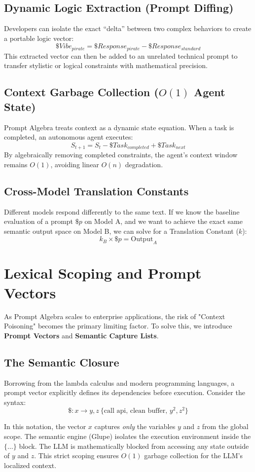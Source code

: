 \documentclass[11pt, a4paper]{article}
\begin{document}
\subsection{Dynamic Logic Extraction (Prompt Diffing)}
Developers can isolate the exact ``delta'' between two complex behaviors to create a portable logic vector:
$$ \$Vibe_{pirate} = \$Response_{pirate} - \$Response_{standard} $$
This extracted vector can then be added to an unrelated technical prompt to transfer stylistic or logical constraints with mathematical precision.

\subsection{Context Garbage Collection ($O(1)$ Agent State)}
Prompt Algebra treats context as a dynamic state equation. When a task is completed, an autonomous agent executes:
$$ S_{t+1} = S_t - \$Task_{completed} + \$Task_{next} $$
By algebraically removing completed constraints, the agent's context window remains $O(1)$, avoiding linear $O(n)$ degradation.

\subsection{Cross-Model Translation Constants}
Different models respond differently to the same text. If we know the baseline evaluation of a prompt $\$p$ on Model A, and we want to achieve the exact same semantic output space on Model B, we can solve for a Translation Constant ($k$):
$$ k_B \times \$p = \text{Output}_A $$

\section{Lexical Scoping and Prompt Vectors}
As Prompt Algebra scales to enterprise applications, the risk of "Context Poisoning" becomes the primary limiting factor. To solve this, we introduce \textbf{Prompt Vectors} and \textbf{Semantic Capture Lists}.

\subsection{The Semantic Closure}
Borrowing from the lambda calculus and modern programming languages, a prompt vector explicitly defines its dependencies before execution. 
Consider the syntax:
$$ \$: x \rightarrow y, z\ \{ \text{call api, clean buffer, } y^2, z^2 \} $$

In this notation, the vector $x$ captures \textit{only} the variables $y$ and $z$ from the global scope. The semantic engine (Glupe) isolates the execution environment inside the $\{ \dots \}$ block. The LLM is mathematically blocked from accessing any state outside of $y$ and $z$. This strict scoping ensures $O(1)$ garbage collection for the LLM's localized context.
\end{document}
